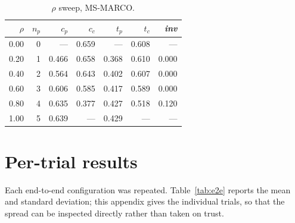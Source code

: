 \begin{table}[t]
\caption{$\rho$ sweep, MS-MARCO.}
\centering\small\setlength{\tabcolsep}{5pt}
\begin{tabular}{@{}rrrrrrr@{}}
\toprule\rowcolor{shieldblueLight}
$\rho$ & $n_p$ & $c_p$ & $c_c$ & $t_p$ & $t_c$ & \emph{inv} \\
\midrule
0.00 & 0 & --- & 0.659 & --- & 0.608 & --- \\
\rowcolor{neutralgray}
0.20 & 1 & 0.466 & 0.658 & 0.368 & 0.610 & 0.000 \\
0.40 & 2 & 0.564 & 0.643 & 0.402 & 0.607 & 0.000 \\
\rowcolor{neutralgray}
0.60 & 3 & 0.606 & 0.585 & 0.417 & 0.589 & 0.000 \\
0.80 & 4 & 0.635 & 0.377 & 0.427 & 0.518 & 0.120 \\
\rowcolor{neutralgray}
1.00 & 5 & 0.639 & --- & 0.429 & --- & --- \\
\bottomrule\end{tabular}\end{table}

\FloatBarrier
\section{Per-trial results}
\label{sec:appD}

Each end-to-end configuration was repeated. Table~\ref{tab:e2e} reports the mean
and standard deviation; this appendix gives the individual trials, so that the
spread can be inspected directly rather than taken on trust.

